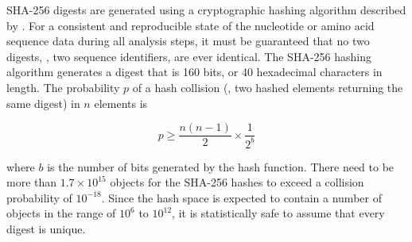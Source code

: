 SHA-256 digests are generated using a cryptographic hashing algorithm described
by \citet{gallagher2008}. For a consistent and reproducible state of the
nucleotide or amino acid sequence data during all analysis steps, it must be
guaranteed that no two digests, \ie, two sequence identifiers, are ever
identical. The SHA-256 hashing algorithm generates a digest that is 160 bits, or
40 hexadecimal characters in length. The probability $p$ of a hash collision
(\ie, two hashed elements returning the same digest) in $n$ elements is

\begin{equation}
p \ge \frac{n (n-1)}{2} \times \frac{1}{2^b}
\label{eq:hashcollision}
\end{equation}

where $b$ is the number of bits generated by the hash function. There need to be
more than $1.7 \times 10^{15}$ objects for the SHA-256 hashes to exceed a collision
probability of $10^{-18}$. Since the hash space is expected to contain a number
of objects in the range of $10^6$ to $10^{12}$, it is statistically safe to
assume that every digest is unique. 

